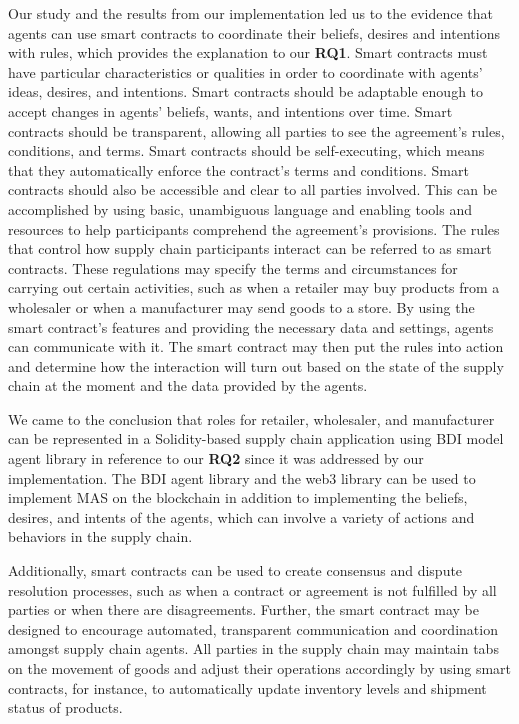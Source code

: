 Our study and the results from our implementation led us to the evidence that agents can use smart contracts to coordinate their beliefs, desires and intentions with rules, which provides the explanation to our \textbf{RQ1}. Smart contracts must have particular characteristics or qualities in order to coordinate with agents' ideas, desires, and intentions. Smart contracts should be adaptable enough to accept changes in agents' beliefs, wants, and intentions over time. Smart contracts should be transparent, allowing all parties to see the agreement's rules, conditions, and terms. Smart contracts should be self-executing, which means that they automatically enforce the contract's terms and conditions. Smart contracts should also be accessible and clear to all parties involved. This can be accomplished by using basic, unambiguous language and enabling tools and resources to help participants comprehend the agreement's provisions. The rules that control how supply chain participants interact can be referred to as smart contracts. These regulations may specify the terms and circumstances for carrying out certain activities, such as when a retailer may buy products from a wholesaler or when a manufacturer may send goods to a store. By using the smart contract's features and providing the necessary data and settings, agents can communicate with it. The smart contract may then put the rules into action and determine how the interaction will turn out based on the state of the supply chain at the moment and the data provided by the agents.

\vspace{.5cm}

We came to the conclusion that roles for retailer, wholesaler, and manufacturer can be represented in a Solidity-based supply chain application using \ac{BDI} model agent library in reference to our \textbf{RQ2} since it was addressed by our implementation. The \ac{BDI} agent library and the web3 library can be used to implement \ac{MAS} on the blockchain in addition to implementing the beliefs, desires, and intents of the agents, which can involve a variety of actions and behaviors in the supply chain.

\vspace{.5cm}

Additionally, smart contracts can be used to create consensus and dispute resolution processes, such as when a contract or agreement is not fulfilled by all parties or when there are disagreements. Further, the smart contract may be designed to encourage automated, transparent communication and coordination amongst supply chain agents. All parties in the supply chain may maintain tabs on the movement of goods and adjust their operations accordingly by using smart contracts, for instance, to automatically update inventory levels and shipment status of products.

